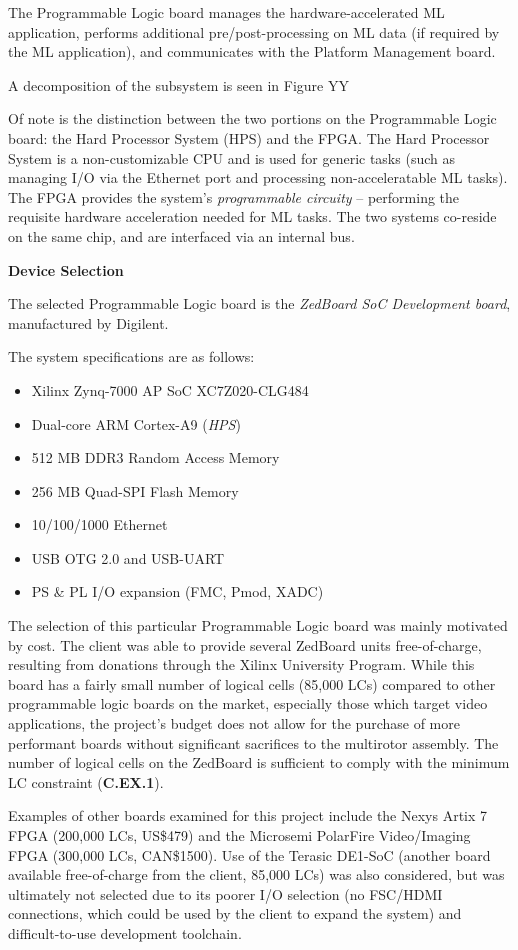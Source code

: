 The Programmable Logic board manages the hardware-accelerated ML application, performs additional pre/post-processing on ML data (if required by the ML application), and communicates with the Platform Management board.

A decomposition of the subsystem is seen in Figure YY

Of note is the distinction between the two portions on the Programmable Logic board: the Hard Processor System (HPS) and the FPGA. The Hard Processor System is a non-customizable CPU and is used for generic tasks (such as managing I/O via the Ethernet port and processing non-acceleratable ML tasks). The FPGA provides the system's \textit{programmable circuity} -- performing the requisite hardware acceleration needed for ML tasks. The two systems co-reside on the same chip, and are interfaced via an internal bus.

\textbf{Device Selection}

The selected Programmable Logic board is the \textit{ZedBoard SoC Development board}, manufactured by Digilent. 

The system specifications are as follows:
\begin{itemize}
\item Xilinx Zynq-7000 AP SoC XC7Z020-CLG484
\item Dual-core ARM Cortex-A9 (\textit{HPS})
\item 512 MB DDR3 Random Access Memory
\item 256 MB Quad-SPI Flash Memory
\item 10/100/1000 Ethernet 
\item USB OTG 2.0 and USB-UART 
\item PS \& PL I/O expansion (FMC, Pmod, XADC)
\end{itemize}

The selection of this particular Programmable Logic board was mainly motivated by cost. The client was able to provide several ZedBoard units free-of-charge, resulting from donations through the Xilinx University Program. While this board has a fairly small number of logical cells (85,000 LCs) compared to other programmable logic boards on the market, especially those which target video applications, the project's budget does not allow for the purchase of more performant boards without significant sacrifices to the multirotor assembly. The number of logical cells on the ZedBoard is sufficient to comply with the minimum LC constraint (\textbf{C.EX.1}).

Examples of other boards examined for this project include the Nexys Artix 7 FPGA (200,000 LCs, US\$479) and the Microsemi PolarFire Video/Imaging FPGA (300,000 LCs, CAN\$1500). Use of the Terasic DE1-SoC (another board available free-of-charge from the client, 85,000 LCs) was also considered, but was ultimately not selected due to its poorer I/O selection (no FSC/HDMI connections, which could be used by the client to expand the system) and difficult-to-use development toolchain.

